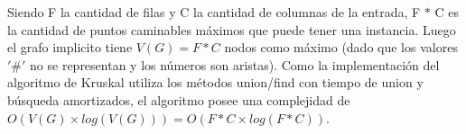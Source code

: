 Siendo F la cantidad de filas y C la cantidad de columnas de la entrada, F $\ast$ C  es la cantidad de puntos caminables máximos que puede tener una instancia. Luego el grafo implicito tiene $V(G) = F \ast C $ nodos como máximo (dado que los valores $'\#'$ no se representan y los números son aristas).
Como la implementación del algoritmo de Kruskal utiliza los métodos union/find con tiempo de union y búsqueda amortizados, el algoritmo posee una complejidad de $O(V(G)\times log(V(G))) = O(F \ast C \times log(F \ast C)) $. 